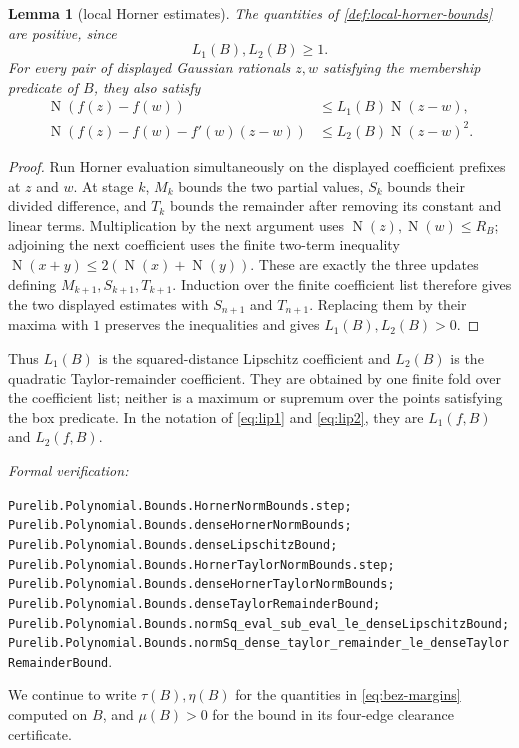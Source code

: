 \documentclass[11pt]{article}
\newtheorem{lemma}[theorem]{Lemma}
\newcommand{\Norm}[1]{\operatorname{N}\!\left(#1\right)}
\newcommand{\leanref}[1]{\par\smallskip\noindent
  \emph{Formal verification:}\par\nobreak
  {\raggedright\nolinkurl{#1}.\par}}
\begin{document}
\begin{lemma}[local Horner estimates]
\label{lem:local-horner-estimates}
The quantities of \cref{def:local-horner-bounds} are positive, since
\[
                         L_1(B),L_2(B)\ge1.
\]
For every pair of displayed Gaussian rationals $z,w$ satisfying the
membership predicate of $B$, they also satisfy
\begin{align}
 \Norm{f(z)-f(w)}
   &\le L_1(B)\Norm{z-w},
   \label{eq:local-l1}\\
 \Norm{f(z)-f(w)-f'(w)(z-w)}
   &\le L_2(B)\Norm{z-w}^2.
   \label{eq:local-l2}
\end{align}
\end{lemma}

\begin{proof}
Run Horner evaluation simultaneously on the displayed coefficient prefixes
at $z$ and $w$.  At stage $k$, $M_k$ bounds the two partial values, $S_k$
bounds their divided difference, and $T_k$ bounds the remainder after
removing its constant and linear terms.  Multiplication by the next argument
uses $\Norm z,\Norm w\le R_B$; adjoining the next coefficient uses the finite
two-term inequality $\Norm{x+y}\le2(\Norm x+\Norm y)$.  These are exactly the
three updates defining $M_{k+1},S_{k+1},T_{k+1}$.  Induction over the finite
coefficient list therefore gives the two displayed estimates with
$S_{n+1}$ and $T_{n+1}$.  Replacing them by their maxima with $1$ preserves
the inequalities and gives $L_1(B),L_2(B)>0$.
\end{proof}

Thus $L_1(B)$ is the squared-distance Lipschitz coefficient and $L_2(B)$
is the quadratic Taylor-remainder coefficient.  They are obtained by one
finite fold over the coefficient list; neither is a maximum or supremum over
the points satisfying the box predicate.  In the notation of
\eqref{eq:lip1} and \eqref{eq:lip2}, they are $L_1(f,B)$ and $L_2(f,B)$.

\leanref{Purelib.Polynomial.Bounds.HornerNormBounds.step;
Purelib.Polynomial.Bounds.denseHornerNormBounds;
Purelib.Polynomial.Bounds.denseLipschitzBound;
Purelib.Polynomial.Bounds.HornerTaylorNormBounds.step;
Purelib.Polynomial.Bounds.denseHornerTaylorNormBounds;
Purelib.Polynomial.Bounds.denseTaylorRemainderBound;
Purelib.Polynomial.Bounds.normSq_eval_sub_eval_le_denseLipschitzBound;
Purelib.Polynomial.Bounds.normSq_dense_taylor_remainder_le_denseTaylorRemainderBound}

We continue to write $\tau(B),\eta(B)$ for the quantities in
\eqref{eq:bez-margins} computed on $B$, and $\mu(B)>0$ for the bound in its
four-edge clearance certificate.
\end{document}
